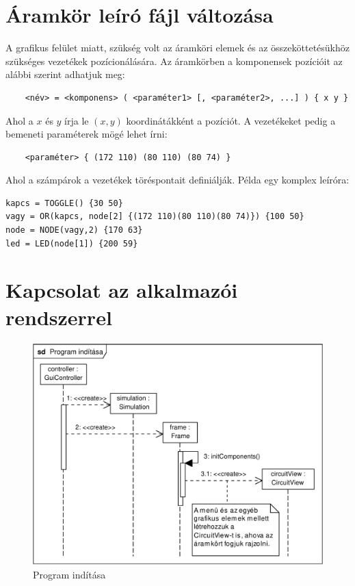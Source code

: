 \section{Áramkör leíró fájl változása}

A grafikus felület miatt, szükség volt az áramköri elemek és az összeköttetésükhöz szükséges vezetékek pozícionálására. Az áramkörben a komponensek pozícióit az alábbi szerint adhatjuk meg:
\begin{verbatim}
	<név> = <komponens> ( <paraméter1> [, <paraméter2>, ...] ) { x y }
\end{verbatim}
Ahol a $x$ és $y$ írja le $(x, y)$ koordinátákként a pozíciót. A vezetékeket pedig a bemeneti paraméterek mögé lehet írni:
\begin{verbatim}
	<paraméter> { (172 110) (80 110) (80 74) }
\end{verbatim}
Ahol a számpárok a vezetékek töréspontait definiálják. Példa egy komplex leíróra:
\begin{verbatim}
kapcs = TOGGLE() {30 50}
vagy = OR(kapcs, node[2] {(172 110)(80 110)(80 74)}) {100 50}
node = NODE(vagy,2) {170 63}
led = LED(node[1]) {200 59}
\end{verbatim}

\section{Kapcsolat az alkalmazói rendszerrel}

\begin{figure}[H]
\begin{center}
\includegraphics[width=17cm]{chapters/chapter11/pdfs/1_program_start.pdf}
\caption{Program indítása}
\label{fig:program_start}
\end{center}
\end{figure}

